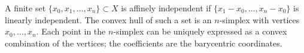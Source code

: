A finite set $\{x_0, x_1, \ldots, x_n\} \subset X$ is affinely independent if $\{x_1 - x_0, \ldots, x_n - x_0\}$ is linearly independent. The convex hull of such a set is an $n$-simplex with vertices $x_0, \ldots, x_n$. Each point in the $n$-simplex can be uniquely expressed as a convex combination of the vertices; the coefficients are the barycentric coordinates.